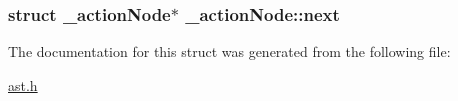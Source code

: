 \subsubsection[{\texorpdfstring{next}{next}}]{\setlength{\rightskip}{0pt plus 5cm}struct {\bf \+\_\+action\+Node}$\ast$ \+\_\+action\+Node\+::next}\hypertarget{struct__actionNode_aaa6e5e1f58d751cd3723ca3553d1633e}{}\label{struct__actionNode_aaa6e5e1f58d751cd3723ca3553d1633e}


The documentation for this struct was generated from the following file\+:\begin{DoxyCompactItemize}
\item 
\hyperlink{ast_8h}{ast.\+h}\end{DoxyCompactItemize}
